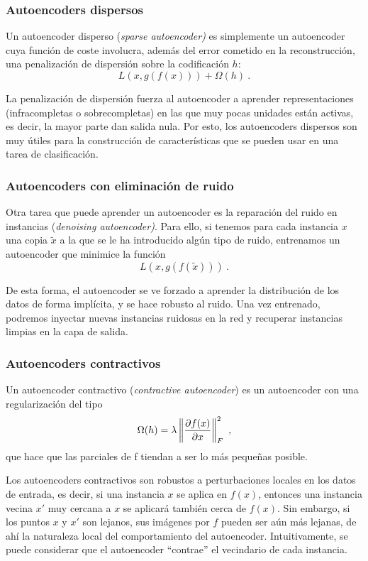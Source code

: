 \subsubsection{Autoencoders dispersos}

Un autoencoder disperso (\textit{sparse autoencoder)} es simplemente un autoencoder cuya función de coste involucra, además del error cometido en la reconstrucción, una penalización de dispersión sobre la codificación $h$:
\[
  L(x,g(f(x)))+\Omega(h)~.
\]

La penalización de dispersión fuerza al autoencoder a aprender representaciones (infracompletas o sobrecompletas) en las que muy pocas unidades están activas, es decir, la mayor parte dan salida nula. Por esto, los autoencoders dispersos son muy útiles para la construcción de características que se pueden usar en una tarea de clasificación.

\subsubsection{Autoencoders con eliminación de ruido}

Otra tarea que puede aprender un autoencoder es la reparación del ruido en instancias (\textit{denoising autoencoder)}. Para ello, si tenemos para cada instancia $x$ una copia $\tilde x$ a la que se le ha introducido algún tipo de ruido, entrenamos un autoencoder que minimice la función
\[
  L(x, g(f(\tilde x)))~.
\]

De esta forma, el autoencoder se ve forzado a aprender la distribución de los datos de forma implícita, y se hace robusto al ruido. Una vez entrenado, podremos inyectar nuevas instancias ruidosas en la red y recuperar instancias limpias en la capa de salida.

\subsubsection{Autoencoders contractivos}

Un autoencoder contractivo (\textit{contractive autoencoder}) es un autoencoder con una regularización del tipo
\[
  \Omega(h)=\lambda\left\lVert\frac{\partial f(x)}{\partial x}\right\rVert^2_F~,
\]
que hace que las parciales de f tiendan a ser lo más pequeñas posible.

Los autoencoders contractivos son robustos a perturbaciones locales en los datos de entrada, es decir, si una instancia $x$ se aplica en $f(x)$, entonces una instancia vecina $x'$ muy cercana a $x$ se aplicará también cerca de $f(x)$. Sin embargo, si los puntos $x$ y $x'$ son lejanos, sus imágenes por $f$ pueden ser aún más lejanas, de ahí la naturaleza local del comportamiento del autoencoder. Intuitivamente, se puede considerar que el autoencoder ``contrae'' el vecindario de cada instancia.

